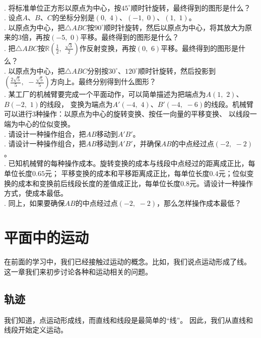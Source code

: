 \documentclass[12pt,UTF8,fontset=none]{ctexbook}
\begin{document}
\begin{xt}
    \mbox{}\\
    . 将标准单位正方形以原点为中心，按$45^\circ$顺时针旋转，最终得到的图形是什么？\\
    . 设点$A$、$B$、$C$的坐标分别是$(0,\,\, 4)$、$(-1,\,\, 0)$、$(1,\,\,1)$。\\
    . 以原点为中心，把$\triangle ABC$按$90^\circ$顺时针旋转，然后以原点为中心，将其放大为原来的$3$倍，再按$(-5, \,\, 0)$平移。最终得到的图形是什么？\\
    . 把$\triangle ABC$按$\mathbb{R}\left(\frac{1}{2},\,\, \frac{\sqrt{3}}{2}\right)$作反射变换，再按$(0,\,\, 6)$平移。最终得到的图形是什么？\\
    . 以原点为中心，把$\triangle ABC$分别按$30^\circ$、$120^\circ$顺时针旋转，然后投影到$\left(\frac{2\sqrt{5}}{5},\,\, -\frac{\sqrt{5}}{5}\right)$方向上。最终分别得到什么图形？\\
    . 某工厂的机械臂要完成一个平面动作，可以简单描述为把端点为$A(1,\,\, 2)$、$B(-2,\,\, 1)$的线段，
    变换为端点为$A'(-4,\,\, 4)$、$B'(-4,\,\, -6)$的线段。机械臂可以进行$3$种操作：以原点为中心的旋转变换、按任一向量的平移变换、
    以线段一端为中心的位似变换。\\
    . 请设计一种操作组合，把$AB$移动到$A'B'$。\\
    . 请设计一种操作组合，把$AB$移动到$A'B'$，并确保$AB$的中点经过点$(-2,\,\, -2)$。\\
    . 已知机械臂的每种操作成本。旋转变换的成本与线段中点经过的距离成正比，每单位长度$0.65$元；
    平移变换的成本和平移距离成正比，每单位长度$0.4$元；位似变换的成本和变换前后线段长度的差值成正比，每单位长度$0.8$元。请设计一种操作方式，使成本最低。\\
    . 同上，如果要确保$AB$的中点经过点$(-2,\,\, -2)$，那么怎样操作成本最低？
\end{xt}

\chapter{平面中的运动}
在前面的学习中，我们已经接触过运动的概念。比如，我们说点运动形成了线。
这一章我们来初步讨论各种和运动相关的问题。

\section{轨迹}
我们知道，点运动形成线，而直线和线段是最简单的“线”。
因此，我们从直线和线段开始定义运动。
\end{document}
